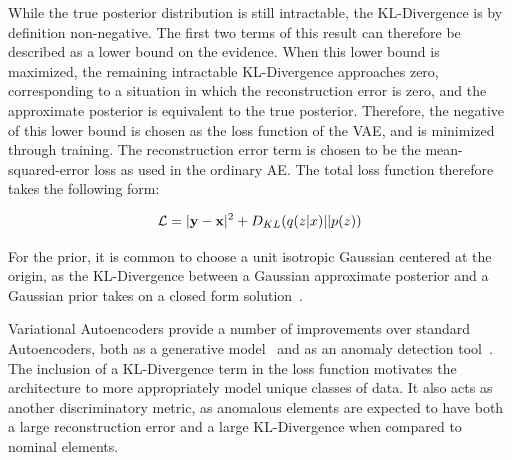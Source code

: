 \documentclass[12pt, a4paper]{article}
\begin{document}
While the true posterior distribution is still intractable, the KL-Divergence is by definition non-negative. The first two terms of this result can therefore be described as a lower bound on the evidence. 
When this lower bound is maximized, the remaining intractable KL-Divergence approaches zero, corresponding to a situation in which the reconstruction error is zero, and the approximate posterior is equivalent to the true posterior. 
Therefore, the negative of this lower bound is chosen as the loss function of the VAE, and is minimized through training. 
The reconstruction error term is chosen to be the mean-squared-error loss as used in the ordinary AE. 
The total loss function therefore takes the following form: 

\begin{equation}
	\mathcal{L} = |{\textbf y} - {\textbf x}|^{2} + D_{KL}(q(z|x)||p(z))
\end{equation} 


For the prior, it is common to choose a unit isotropic Gaussian centered at the origin, as the KL-Divergence between a Gaussian approximate posterior and a Gaussian prior takes on a closed form solution~\cite{Goodfellow-et-al-2016}.



Variational Autoencoders provide a number of improvements over standard Autoencoders, both as a generative model~\cite{kingma2014autoencoding} and as an anomaly detection tool~\cite{An2015VariationalAB}. The inclusion of a KL-Divergence term in the loss function motivates the architecture to more appropriately model unique classes of data. It also acts as another discriminatory metric, as anomalous elements are expected to have both a large reconstruction error and a large KL-Divergence when compared to nominal elements.
\end{document}
